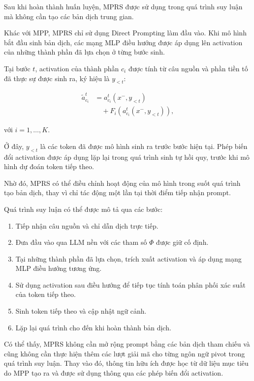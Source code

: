 Sau khi hoàn thành huấn luyện, MPRS được sử dụng trong quá trình suy luận mà không cần tạo các bản dịch trung gian.

Khác với MPP, MPRS chỉ sử dụng Direct Prompting làm đầu vào. Khi mô hình bắt đầu sinh bản dịch, các mạng MLP điều hướng được áp dụng lên activation của những thành phần đã lựa chọn ở từng bước sinh.

Tại bước $t$, activation của thành phần $c_i$ được tính từ câu nguồn và phần tiền tố đã thực sự được sinh ra, ký hiệu là $y_{<t}$:

\begin{equation}
	\begin{aligned}
		\tilde{a}_{c_i}^{t}
		&=
		a_{c_i}^{t}(x^-,y_{<t})\\
		&\quad+
		F_i\left(
		a_{c_i}^{t}(x^-,y_{<t})
		\right),
	\end{aligned}
	\label{eq:mprs-inference}
\end{equation}

với $i=1,\ldots,K$.

Ở đây, $y_{<t}$ là các token đã được mô hình sinh ra trước bước hiện tại. Phép biến đổi activation được áp dụng lặp lại trong quá trình sinh tự hồi quy, trước khi mô hình dự đoán token tiếp theo.

Nhờ đó, MPRS có thể điều chỉnh hoạt động của mô hình trong suốt quá trình tạo bản dịch, thay vì chỉ tác động một lần tại thời điểm tiếp nhận prompt.

Quá trình suy luận có thể được mô tả qua các bước:

\begin{enumerate}
	\item Tiếp nhận câu nguồn và chỉ dẫn dịch trực tiếp.
	\item Đưa đầu vào qua LLM nền với các tham số $\Phi$ được giữ cố định.
	\item Tại những thành phần đã lựa chọn, trích xuất activation và áp dụng mạng MLP điều hướng tương ứng.
	\item Sử dụng activation sau điều hướng để tiếp tục tính toán phân phối xác suất của token tiếp theo.
	\item Sinh token tiếp theo và cập nhật ngữ cảnh.
	\item Lặp lại quá trình cho đến khi hoàn thành bản dịch.
\end{enumerate}

Có thể thấy, MPRS không cần mở rộng prompt bằng các bản dịch tham chiếu và cũng không cần thực hiện thêm các lượt giải mã cho từng ngôn ngữ pivot trong quá trình suy luận. Thay vào đó, thông tin hữu ích được học từ dữ liệu mục tiêu do MPP tạo ra và được sử dụng thông qua các phép biến đổi activation.

